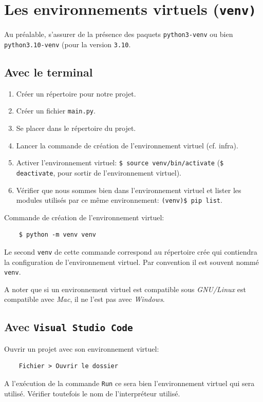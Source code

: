 \documentclass[a4paper,12pt]{book}
\begin{document}
\section{Les environnements virtuels (\texttt{venv)}}
Au préalable, s'assurer de la présence des paquets \texttt{python3-venv} ou bien \texttt{python3.10-venv} (pour la version \texttt{3.10}.
\subsection*{Avec le terminal}
\begin{enumerate}
	\item Créer un répertoire pour notre projet.
	\item Créer un fichier \texttt{main.py}.
	\item Se placer dans le répertoire du projet.
	\item Lancer la commande de création de l'environnement virtuel (cf. infra).
	\item Activer l'environnement virtuel: \verb|$ source venv/bin/activate| (\verb|$ deactivate|, pour sortir de l'environnement virtuel).
	\item Vérifier que nous sommes bien dans l'environnement virtuel et lister les modules utilisés par ce même environnement: \verb|(venv)$ pip list|.
\end{enumerate}
\medskip

Commande de création de l'environnement virtuel:
\begin{verbatim}
    $ python -m venv venv
\end{verbatim}
\medskip

Le second \texttt{venv} de cette commande correspond au répertoire crée qui contiendra la configuration de l'environnement virtuel. Par convention il est souvent nommé \texttt{venv}.
\medskip

A noter que si un environnement virtuel est compatible sous \textit{GNU/Linux} est compatible avec \textit{Mac}, il ne l'est pas avec \textit{Windows}.
\medskip

\subsection*{Avec \texttt{Visual Studio Code}}
Ouvrir un projet avec son environnement virtuel:
\begin{verbatim}
    Fichier > Ouvrir le dossier
\end{verbatim}
\medskip

A l'exécution de la commande \texttt{Run} ce sera bien l'environnement virtuel qui sera utilisé. Vérifier toutefois le nom de l'interpréteur utilisé.
\medskip
\end{document}
